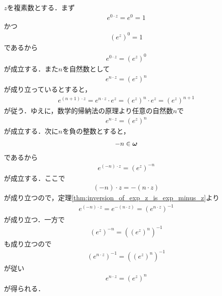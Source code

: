	\begin{sketch}
		$z$を複素数とする．まず
		\begin{align}
			e^{0 \cdot z} = e^0 = 1
		\end{align}
		かつ
		\begin{align}
			(e^z)^0 = 1
		\end{align}
		であるから
		\begin{align}
			e^{0 \cdot z} = (e^z)^0
		\end{align}
		が成立する．また$n$を自然数として
		\begin{align}
			e^{n \cdot z} = (e^z)^n
		\end{align}
		が成り立っているとすると，
		\begin{align}
			e^{(n+1) \cdot z}
			= e^{n \cdot z} \cdot e^z
			= (e^z)^n \cdot e^z
			= (e^z)^{n+1}
		\end{align}
		が従う．ゆえに，数学的帰納法の原理より任意の自然数$n$で
		\begin{align}
			e^{n \cdot z} = (e^z)^n
		\end{align}
		が成立する．次に$n$を負の整数とすると，
		\begin{align}
			-n \in {\boldsymbol \omega}
		\end{align}
		であるから
		\begin{align}
			e^{(-n) \cdot z} = (e^z)^{-n}
		\end{align}
		が成立する．ここで
		\begin{align}
			(-n) \cdot z = -(n \cdot z)
		\end{align}
		が成り立つので，定理\ref{thm:inversion_of_exp_z_is_exp_minus_z}より
		\begin{align}
			e^{(-n) \cdot z} = e^{-(n \cdot z)} = (e^{n \cdot z})^{-1}
		\end{align}
		が成り立つ．一方で
		\begin{align}
			(e^z)^{-n} = ((e^z)^n)^{-1}
		\end{align}
		も成り立つので
		\begin{align}
			(e^{n \cdot z})^{-1} = ((e^z)^n)^{-1}
		\end{align}
		が従い
		\begin{align}
			e^{n \cdot z} = (e^z)^n
		\end{align}
		が得られる．
		\QED
	\end{sketch}